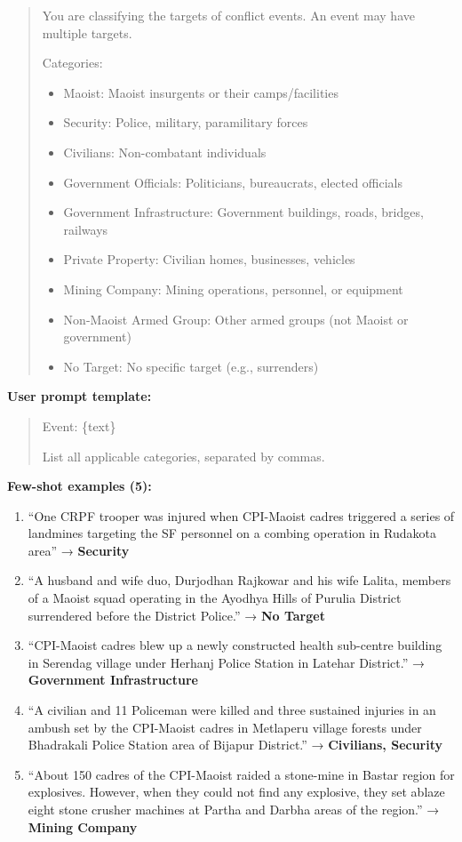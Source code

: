 \documentclass[
  11pt,
]{article}
\providecommand{\tightlist}{%
  \setlength{\itemsep}{0pt}\setlength{\parskip}{0pt}}
\begin{document}
\begin{quote}
You are classifying the targets of conflict events. An event may have
multiple targets.

Categories:

\begin{itemize}
\tightlist
\item
  Maoist: Maoist insurgents or their camps/facilities
\item
  Security: Police, military, paramilitary forces
\item
  Civilians: Non-combatant individuals
\item
  Government Officials: Politicians, bureaucrats, elected officials
\item
  Government Infrastructure: Government buildings, roads, bridges,
  railways
\item
  Private Property: Civilian homes, businesses, vehicles
\item
  Mining Company: Mining operations, personnel, or equipment
\item
  Non-Maoist Armed Group: Other armed groups (not Maoist or government)
\item
  No Target: No specific target (e.g., surrenders)
\end{itemize}
\end{quote}

\textbf{User prompt template:}

\begin{quote}
Event: \{text\}

List all applicable categories, separated by commas.
\end{quote}

\textbf{Few-shot examples (5):}

\begin{enumerate}
\def\labelenumi{\arabic{enumi}.}
\tightlist
\item
  ``One CRPF trooper was injured when CPI-Maoist cadres triggered a
  series of landmines targeting the SF personnel on a combing operation
  in Rudakota area'' → \textbf{Security}
\item
  ``A husband and wife duo, Durjodhan Rajkowar and his wife Lalita,
  members of a Maoist squad operating in the Ayodhya Hills of Purulia
  District surrendered before the District Police.'' → \textbf{No
  Target}
\item
  ``CPI-Maoist cadres blew up a newly constructed health sub-centre
  building in Serendag village under Herhanj Police Station in Latehar
  District.'' → \textbf{Government Infrastructure}
\item
  ``A civilian and 11 Policeman were killed and three sustained injuries
  in an ambush set by the CPI-Maoist cadres in Metlaperu village forests
  under Bhadrakali Police Station area of Bijapur District.'' →
  \textbf{Civilians, Security}
\item
  ``About 150 cadres of the CPI-Maoist raided a stone-mine in Bastar
  region for explosives. However, when they could not find any
  explosive, they set ablaze eight stone crusher machines at Partha and
  Darbha areas of the region.'' → \textbf{Mining Company}
\end{enumerate}
\end{document}
